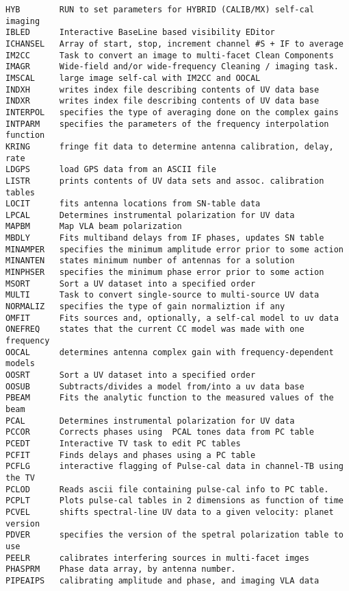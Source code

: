 \begin{verbatim}
HYB        RUN to set parameters for HYBRID (CALIB/MX) self-cal imaging
IBLED      Interactive BaseLine based visibility EDitor
ICHANSEL   Array of start, stop, increment channel #S + IF to average
IM2CC      Task to convert an image to multi-facet Clean Components
IMAGR      Wide-field and/or wide-frequency Cleaning / imaging task.
IMSCAL     large image self-cal with IM2CC and OOCAL
INDXH      writes index file describing contents of UV data base
INDXR      writes index file describing contents of UV data base
INTERPOL   specifies the type of averaging done on the complex gains
INTPARM    specifies the parameters of the frequency interpolation function
KRING      fringe fit data to determine antenna calibration, delay, rate
LDGPS      load GPS data from an ASCII file
LISTR      prints contents of UV data sets and assoc. calibration tables
LOCIT      fits antenna locations from SN-table data
LPCAL      Determines instrumental polarization for UV data
MAPBM      Map VLA beam polarization
MBDLY      Fits multiband delays from IF phases, updates SN table
MINAMPER   specifies the minimum amplitude error prior to some action
MINANTEN   states minimum number of antennas for a solution
MINPHSER   specifies the minimum phase error prior to some action
MSORT      Sort a UV dataset into a specified order
MULTI      Task to convert single-source to multi-source UV data
NORMALIZ   specifies the type of gain normaliztion if any
OMFIT      Fits sources and, optionally, a self-cal model to uv data
ONEFREQ    states that the current CC model was made with one frequency
OOCAL      determines antenna complex gain with frequency-dependent models
OOSRT      Sort a UV dataset into a specified order
OOSUB      Subtracts/divides a model from/into a uv data base
PBEAM      Fits the analytic function to the measured values of the beam
PCAL       Determines instrumental polarization for UV data
PCCOR      Corrects phases using  PCAL tones data from PC table
PCEDT      Interactive TV task to edit PC tables
PCFIT      Finds delays and phases using a PC table
PCFLG      interactive flagging of Pulse-cal data in channel-TB using the TV
PCLOD      Reads ascii file containing pulse-cal info to PC table.
PCPLT      Plots pulse-cal tables in 2 dimensions as function of time
PCVEL      shifts spectral-line UV data to a given velocity: planet version
PDVER      specifies the version of the spetral polarization table to use
PEELR      calibrates interfering sources in multi-facet imges
PHASPRM    Phase data array, by antenna number.
PIPEAIPS   calibrating amplitude and phase, and imaging VLA data

\end{verbatim}
